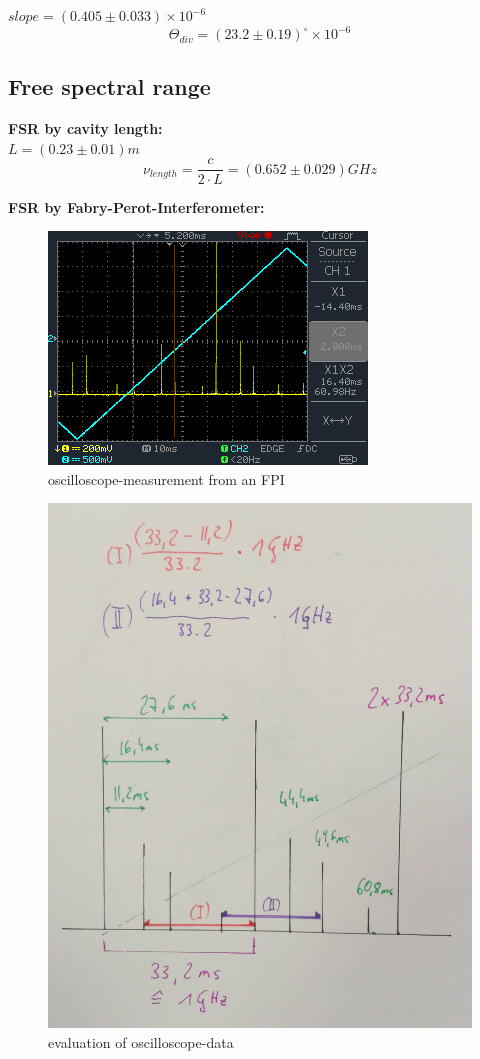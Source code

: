 \documentclass[12pt,a4paper]{article}
\begin{document}
\begin{multicols}{2}
\noindent $slope = (0.405 \pm 0.033) \times 10^{-6}$
$$\Theta_{div} = (23.2 \pm 0.19)^{\circ} \times 10^{-6}$$

\subsection{Free spectral range}
\textbf{FSR by cavity length:}\\
$L = (0.23 \pm 0.01)m$
$$\nu_{length} = \frac{c}{2\cdot L}=(0.652\pm 0.029)GHz$$

\noindent \textbf{FSR by Fabry-Perot-Interferometer:}\\

\begin{figure}[H]
 \centering
 \includegraphics[scale=0.90]{./figures/FPI_osci.png}
 \caption{oscilloscope-measurement from an FPI}
 \label{fig:FPI_osci}
\end{figure}

\begin{figure}[H]
 \centering
 \includegraphics[scale=0.11]{./figures/FPI_explain.jpeg}
 \caption{evaluation of oscilloscope-data}
 \label{fig:FPI_explain}
\end{figure}


\end{multicols}
\end{document}
